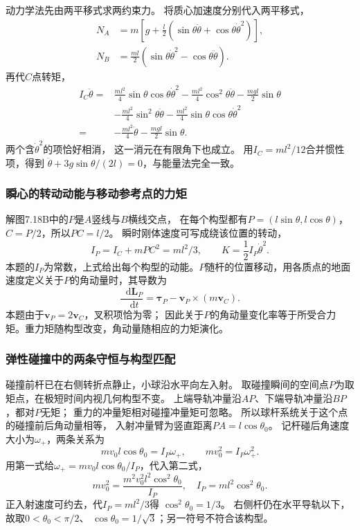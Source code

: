 \documentclass[UTF8,fontset=fandol,a4paper,11pt]{ctexart}
\newcommand{\dd}{\mathop{}\!\mathrm{d}}
\begin{document}
动力学法先由两平移式求两约束力。
将质心加速度分别代入两平移式，
\[
\begin{aligned}
N_A&=m\left[g+\frac l2(\sin\theta\ddot\theta+\cos\theta\dot\theta^2)\right],\\
N_B&=\frac{ml}{2}(\sin\theta\dot\theta^2-\cos\theta\ddot\theta).
\end{aligned}
\]
再代$C$点转矩，
\[
\begin{aligned}
I_C\ddot\theta
={}&\frac{ml^2}{4}\sin\theta\cos\theta\dot\theta^2
-\frac{ml^2}{4}\cos^2\theta\ddot\theta
-\frac{mgl}{2}\sin\theta\\
&-\frac{ml^2}{4}\sin^2\theta\ddot\theta
-\frac{ml^2}{4}\sin\theta\cos\theta\dot\theta^2\\
={}&-\frac{ml^2}{4}\ddot\theta-\frac{mgl}{2}\sin\theta.
\end{aligned}
\]
两个含$\dot\theta^2$的项恰好相消，
这一消元在有限角下也成立。
用$I_C=ml^2/12$合并惯性项，得到
$\ddot\theta+3g\sin\theta/(2l)=0$，与能量法完全一致。

\subsubsection*{瞬心的转动动能与移动参考点的力矩}
解图7.18B中的$P$是$A$竖线与$B$横线交点，
在每个构型都有$P=(l\sin\theta,l\cos\theta)$，
$C=P/2$，所以$PC=l/2$。
瞬时刚体速度可写成绕该位置的转动，
\[
I_P=I_C+mPC^2=ml^2/3,\qquad K=\frac12I_P\dot\theta^2.
\]
本题的$I_P$为常数，上式给出每个构型的动能。$P$随杆的位置移动，用各质点的地面速度定义关于$P$的角动量时，其导数为
\[
\frac{\dd\boldsymbol L_P}{\dd t}
=\boldsymbol\tau_P-\boldsymbol v_P\times(m\boldsymbol v_C).
\]
本题由于$\boldsymbol v_P=2\boldsymbol v_C$，叉积项恰为零；
因此关于$P$的角动量变化率等于所受合力矩。重力矩随构型改变，角动量随相应的力矩演化。

\subsubsection*{弹性碰撞中的两条守恒与构型匹配}
碰撞前杆已在右侧转折点静止，小球沿水平向左入射。
取碰撞瞬间的空间点$P$为取矩点，在极短时间内视几何构型不变。
上端导轨冲量沿$AP$、下端导轨冲量沿$BP$，都对$P$无矩；
重力的冲量矩相对碰撞冲量矩可忽略。
所以球杆系统关于这个点的碰撞前后角动量相等，
入射冲量臂为竖直距离$PA=l\cos\theta_0$。
记杆碰后角速度大小为$\omega_+$，两条关系为
\[
mv_0l\cos\theta_0=I_P\omega_+,\qquad
mv_0^2=I_P\omega_+^2.
\]
用第一式给$\omega_+=mv_0l\cos\theta_0/I_P$，代入第二式，
\[
mv_0^2=\frac{m^2v_0^2l^2\cos^2\theta_0}{I_P},
\quad I_P=ml^2\cos^2\theta_0.
\]
正入射速度可约去，代$I_P=ml^2/3$得
$\cos^2\theta_0=1/3$。
右侧杆仍在水平导轨以下，故取$0<\theta_0<\pi/2$、
$\cos\theta_0=1/\sqrt3$；另一符号不符合该构型。
\end{document}
